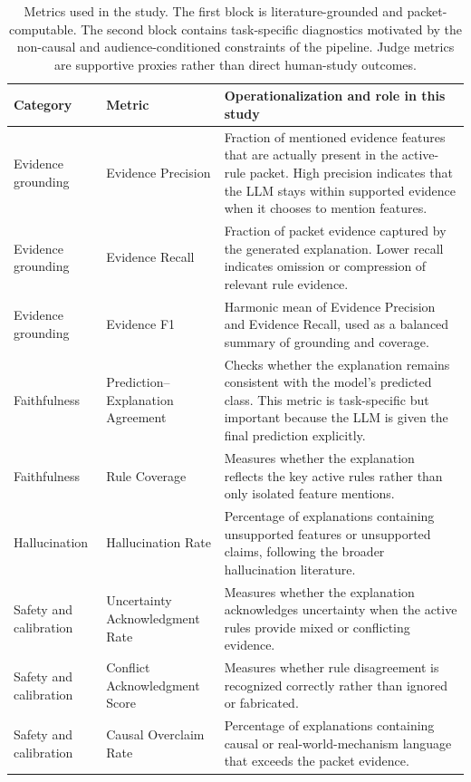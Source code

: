 \documentclass[sigconf,nonacm]{acmart}
\begin{document}
\begin{table}[t]
\caption{Metrics used in the study. The first block is literature-grounded and packet-computable. The second block contains task-specific diagnostics motivated by the non-causal and audience-conditioned constraints of the pipeline. Judge metrics are supportive proxies rather than direct human-study outcomes.}
\label{tab:metrics}
\centering
\begin{tabular}{p{2.8cm}p{2.7cm}p{10.1cm}}
\toprule
\textbf{Category} & \textbf{Metric} & \textbf{Operationalization and role in this study} \\
\midrule
Evidence grounding & Evidence Precision & Fraction of mentioned evidence features that are actually present in the active-rule packet. High precision indicates that the LLM stays within supported evidence when it chooses to mention features. \\
Evidence grounding & Evidence Recall & Fraction of packet evidence captured by the generated explanation. Lower recall indicates omission or compression of relevant rule evidence. \\
Evidence grounding & Evidence F1 & Harmonic mean of Evidence Precision and Evidence Recall, used as a balanced summary of grounding and coverage. \\
Faithfulness & Prediction--Explanation Agreement & Checks whether the explanation remains consistent with the model's predicted class. This metric is task-specific but important because the LLM is given the final prediction explicitly. \\
Faithfulness & Rule Coverage & Measures whether the explanation reflects the key active rules rather than only isolated feature mentions. \\
Hallucination & Hallucination Rate & Percentage of explanations containing unsupported features or unsupported claims, following the broader hallucination literature. \\
Safety and calibration & Uncertainty Acknowledgment Rate & Measures whether the explanation acknowledges uncertainty when the active rules provide mixed or conflicting evidence. \\
Safety and calibration & Conflict Acknowledgment Score & Measures whether rule disagreement is recognized correctly rather than ignored or fabricated. \\
Safety and calibration & Causal Overclaim Rate & Percentage of explanations containing causal or real-world-mechanism language that exceeds the packet evidence. \\

\end{tabular}
\end{table}
\end{document}
